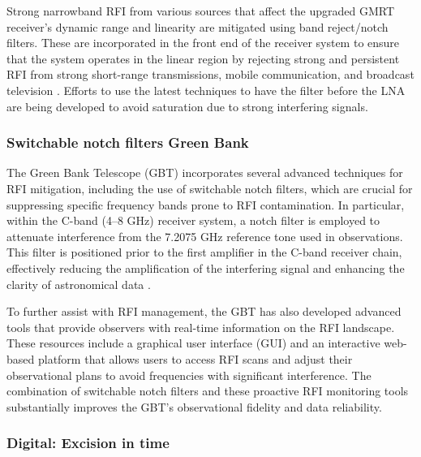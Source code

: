 Strong narrowband RFI from various sources that affect the upgraded GMRT receiver’s dynamic range and linearity are mitigated using band reject/notch filters. These are incorporated in the front end of the receiver system to ensure that the system operates in the linear region by rejecting strong and persistent RFI from strong short-range transmissions, mobile communication, and broadcast television \cite{sureshkumar2016rfi}. Efforts to use the latest techniques to have the filter before the LNA are being developed to avoid saturation due to strong interfering signals.

\subsubsection{Switchable notch filters Green Bank}

The Green Bank Telescope (GBT) incorporates several advanced techniques for RFI mitigation, including the use of switchable notch filters, which are crucial for suppressing specific frequency bands prone to RFI contamination. In particular, within the C-band (4–8 GHz) receiver system, a notch filter is employed to attenuate interference from the 7.2075 GHz reference tone used in observations. This filter is positioned prior to the first amplifier in the C-band receiver chain, effectively reducing the amplification of the interfering signal and enhancing the clarity of astronomical data \cite{gbt1}. 

To further assist with RFI management, the GBT has also developed advanced tools that provide observers with real-time information on the RFI landscape. These resources include a graphical user interface (GUI) and an interactive web-based platform that allows users to access RFI scans and adjust their observational plans to avoid frequencies with significant interference. The combination of switchable notch filters and these proactive RFI monitoring tools substantially improves the GBT’s observational fidelity and data reliability.

\subsubsection{Digital: Excision in time}

